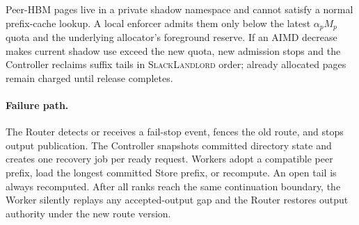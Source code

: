 Peer-HBM pages live in a private shadow namespace and cannot satisfy a normal
prefix-cache lookup.  A local enforcer admits them only below the latest
$\alpha_pM_p$ quota and the underlying allocator's foreground reserve.  If an
AIMD decrease makes current shadow use exceed the new quota, new admission
stops and the Controller reclaims suffix tails in \textsc{SlackLandlord} order;
already allocated pages remain charged until release completes.

\paragraph{Failure path.}
The Router detects or receives a fail-stop event, fences the old route, and
stops output publication.  The Controller snapshots committed directory state
and creates one recovery job per ready request.  Workers adopt a compatible
peer prefix, load the longest committed Store prefix, or recompute.  An open
tail is always recomputed.  After all ranks reach the same continuation
boundary, the Worker silently replays any accepted-output gap and the Router
restores output authority under the new route version.

